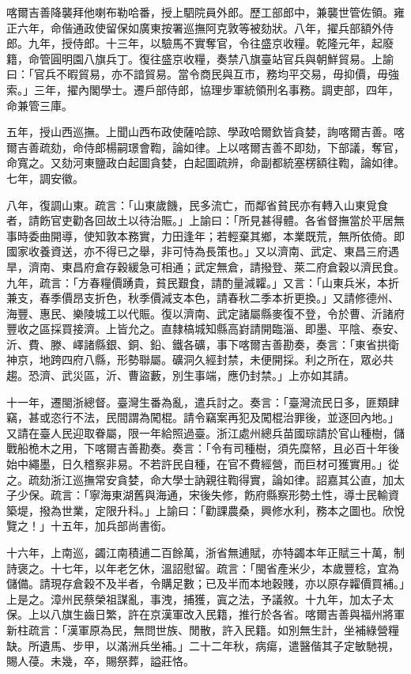 \begin{pinyinscope}
喀爾吉善降襲拜他喇布勒哈番，授上駟院員外郎。歷工部郎中，兼襲世管佐領。雍正六年，命偕通政使留保如廣東按署巡撫阿克敦等被劾狀。八年，擢兵部額外侍郎。九年，授侍郎。十三年，以驗馬不實奪官，令往盛京收糧。乾隆元年，起廢籍，命管圓明園八旗兵丁。復往盛京收糧，奏禁八旗臺站官兵與朝鮮貿易。上諭曰：「官兵不暇貿易，亦不諳貿易。當令商民與互巿，務均平交易，毋抑價，毋強索。」三年，擢內閣學士。遷戶部侍郎，協理步軍統領刑名事務。調吏部，四年，命兼管三庫。

五年，授山西巡撫。上聞山西布政使薩哈諒、學政哈爾欽皆貪婪，詢喀爾吉善。喀爾吉善疏劾，命侍郎楊嗣璟會鞫，論如律。上以喀爾吉善不即劾，下部議，奪官，命寬之。又劾河東鹽政白起圖貪婪，白起圖疏辨，命副都統塞楞額往鞫，論如律。七年，調安徽。

八年，復調山東。疏言：「山東歲饑，民多流亡，而鄰省貧民亦有轉入山東覓食者，請飭官吏勸各回故土以待治賑。」上諭曰：「所見甚得體。各省督撫當於平居無事時委曲開導，使知敦本務實，力田逢年；若輕棄其鄉，本業既荒，無所依倚。即國家收養資送，亦不得已之舉，非可恃為長策也。」又以濟南、武定、東昌三府遇旱，濟南、東昌府倉存穀緩急可相通；武定無倉，請撥登、萊二府倉穀以濟民食。九年，疏言：「方春糧價踴貴，貧民艱食，請酌量減糶。」又言：「山東兵米，本折兼支，春季價昂支折色，秋季價減支本色，請春秋二季本折更換。」又請修德州、海豐、惠民、樂陵城工以代賑。復以濟南、武定諸屬縣麥復不登，令於曹、沂諸府豐收之區採買接濟。上皆允之。直隸槁城知縣高崶請開臨淄、即墨、平陰、泰安、沂、費、滕、嶧諸縣銀、銅、鉛、鐵各礦，事下喀爾吉善勘奏，奏言：「東省拱衛神京，地跨四府八縣，形勢聯屬。礦洞久經封禁，未便開採。利之所在，眾必共趨。恐濟、武災區，沂、曹盜藪，別生事端，應仍封禁。」上亦如其請。

十一年，遷閩浙總督。臺灣生番為亂，遣兵討之。奏言：「臺灣流民日多，匪類肆竊，甚或恣行不法，民間謂為闖棍。請令竊案再犯及闖棍治罪後，並逐回內地。」又請在臺人民迎取眷屬，限一年給照過臺。浙江處州總兵苗國琮請於官山種樹，儲戰船桅木之用，下喀爾吉善勘奏。奏言：「令有司種樹，須先糜帑，且必百十年後始中繩墨，日久稽察非易。不若許民自種，在官不費經營，而巨材可獲實用。」從之。疏劾浙江巡撫常安貪婪，命大學士訥親往鞫得實，論如律。詔嘉其公直，加太子少保。疏言：「寧海東湖舊與海通，宋後失修，飭府縣察形勢土性，導士民輸資築堤，撥為世業，定限升科。」上諭曰：「勸課農桑，興修水利，務本之圖也。欣悅覽之！」十五年，加兵部尚書銜。

十六年，上南巡，蠲江南積逋二百餘萬，浙省無逋賦，亦特蠲本年正賦三十萬，制詩褒之。十七年，以年老乞休，溫詔慰留。疏言：「閩省產米少，本歲豐稔，宜為儲備。請現存倉穀不及半者，令購足數；已及半而本地穀賤，亦以原存糶價買補。」上是之。漳州民蔡榮祖謀亂，事洩，捕獲，寘之法，予議敘。十九年，加太子太保。上以八旗生齒日繁，許在京漢軍改入民籍，推行於各省。喀爾吉善與福州將軍新柱疏言：「漢軍原為民，無問世族、閒散，許入民籍。如別無生計，坐補綠營糧缺。所遺馬、步甲，以滿洲兵坐補。」二十二年秋，病瘍，遣醫偕其子定敏馳視，賜人葠。未幾，卒，賜祭葬，謚莊恪。


\end{pinyinscope}
